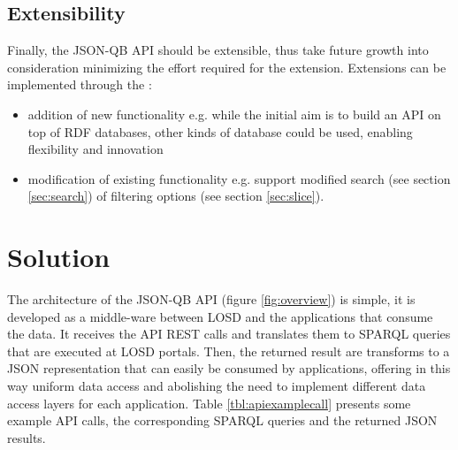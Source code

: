 \documentclass{llncs}
\begin{document}
\subsection{Extensibility}

Finally, the JSON-QB API should be extensible, thus take future growth into consideration minimizing the effort required for the extension. Extensions can be implemented through the :
\begin{itemize}
\item addition of new functionality e.g. while the initial aim is to build an API on top of RDF databases, other kinds of database could be used, enabling flexibility and innovation
\item modification of existing functionality e.g. support modified search (see section \ref{sec:search}) of filtering options (see section \ref{sec:slice}).
\end{itemize} 


\section{Solution}\label{sec:solution}

The architecture of the JSON-QB API (figure \ref{fig:overview}) is simple, it is developed as a middle-ware between LOSD and the applications that consume the data. It receives the API REST calls and translates them to SPARQL queries that are executed at LOSD portals. Then, the returned result are transforms to a JSON representation that can easily be consumed by applications, offering in this way uniform data access and abolishing the need to implement different data access layers for each application. Table \ref{tbl:apiexamplecall} presents some example API calls, the corresponding SPARQL queries and the returned JSON results.
\end{document}
